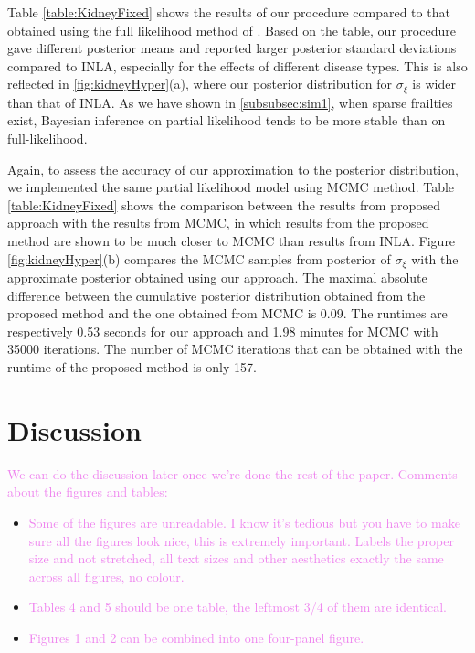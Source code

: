 \documentclass[ba]{imsart}
\newcommand{\alex}[1]{\textcolor{violet}{{ }#1}}
\begin{document}
Table \ref{table:KidneyFixed} shows the results of our procedure compared to that obtained using the full likelihood method of \cite{inlacoxph}. Based on the table, our procedure gave different posterior means and reported larger posterior standard deviations compared to INLA, especially for the effects of different disease types. This is also reflected in \ref{fig:kidneyHyper}(a), where our posterior distribution for $\sigma_{\xi}$ is wider than that of INLA. As we have shown in \ref{subsubsec:sim1}, when sparse frailties exist, Bayesian inference on partial likelihood tends to be more stable than on full-likelihood.

Again, to assess the accuracy of our approximation to the posterior distribution, we implemented the same partial likelihood model using MCMC method. Table \ref{table:KidneyFixed} shows the comparison between the results from proposed approach with the results from MCMC, in which results from the proposed method are shown to be much closer to MCMC than results from INLA.
Figure \ref{fig:kidneyHyper}(b) compares the MCMC samples from posterior of $\sigma_{\xi}$ with the approximate posterior obtained using our approach. The maximal absolute difference between the cumulative posterior distribution obtained from the proposed method and the one obtained from MCMC is 0.09. The runtimes are respectively 0.53 seconds for our approach and 1.98 minutes for MCMC with 35000 iterations. The number of MCMC iterations that can be obtained with the runtime of the proposed method is only 157.

\section{Discussion}\label{sec:discussion}

\alex{We can do the discussion later once we're done the rest of the paper. Comments about the figures and tables:}

\begin{itemize}
	\item \alex{Some of the figures are unreadable. I know it's tedious but you have to make sure all the figures look nice, this is extremely important. Labels the proper size and not stretched, all text sizes and other aesthetics exactly the same across all figures, no colour.}
	\item \alex{Tables 4 and 5 should be one table, the leftmost 3/4 of them are identical.}
	\item \alex{Figures 1 and 2 can be combined into one four-panel figure.}
\end{itemize}
\end{document}
